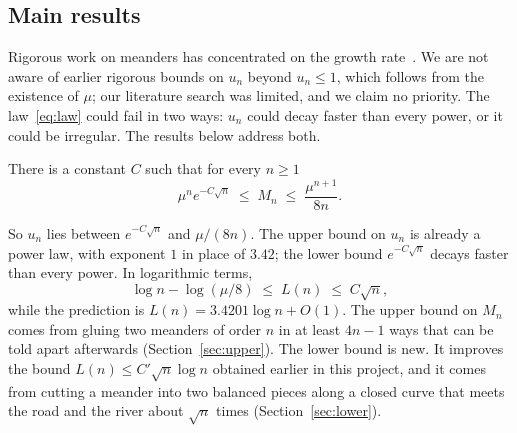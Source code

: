 \subsection{Main results}

Rigorous work on meanders has concentrated on the growth rate~\cite{AP,PaperB}. We are not aware
of earlier rigorous bounds on $u_n$ beyond $u_n\le1$, which follows from the existence of $\mu$;
our literature search was limited, and we claim no priority. The law~\eqref{eq:law} could fail in two
ways: $u_n$ could decay faster than every power, or it could be irregular. The results below address
both.

\begin{theorem}\label{thm:main}
There is a constant $C$ such that for every $n\ge1$
\[ \mu^n e^{-C\sqrt n} \;\le\; M_n \;\le\; \frac{\mu^{n+1}}{8n} . \]
\end{theorem}

So $u_n$ lies between $e^{-C\sqrt n}$ and $\mu/(8n)$. The upper bound on $u_n$ is already a power
law, with exponent $1$ in place of $3.42$; the lower bound $e^{-C\sqrt n}$ decays faster than every
power. In
logarithmic terms,
\[ \log n-\log(\mu/8) \;\le\; L(n) \;\le\; C\sqrt n, \]
while the prediction is $L(n)=3.4201\log n+O(1)$. The upper bound on $M_n$ comes from gluing two meanders of
order $n$ in at least $4n-1$ ways that can be told apart afterwards (Section~\ref{sec:upper}). The lower
bound is new. It improves the bound $L(n)\le C'\sqrt n\log n$ obtained earlier in this project, and it
comes from cutting a meander into two balanced pieces along a closed curve that meets the road and
the river about $\sqrt n$ times (Section~\ref{sec:lower}).

